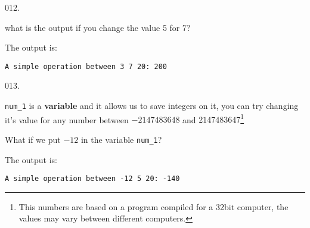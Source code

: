 \documentclass[]{book}
\begin{document}
\vspace{2mm}\noindent\hrulefill{}

\begin{minipage}{\linewidth}\noindent
{\tiny 012.}\\
\begin{minipage}[t]{.485\linewidth}

what is the output if you change the value 5 for 7?

\end{minipage}
\hfill
\begin{minipage}[t]{.485\linewidth}

The output is:

\begin{framed}

\begin{verbatim}
A simple operation between 3 7 20: 200
\end{verbatim}

\end{framed}

\end{minipage}
\end{minipage}

\vspace{2mm}\noindent\hrulefill{}

\begin{minipage}{\linewidth}\noindent
{\tiny 013.}\\
\begin{minipage}[t]{.485\linewidth}

\texttt{num\_1} is a \textbf{variable} and it allows us to save integers
on it, you can try changing it's value for any number between
\(-2147483648\) and \(2147483647\)\footnote{This numbers are based on a
  program compiled for a 32bit computer, the values may vary between
  different computers.}

What if we put \(-12\) in the variable \texttt{num\_1}?

\end{minipage}
\hfill
\begin{minipage}[t]{.485\linewidth}

The output is:

\begin{framed}

\begin{verbatim}
A simple operation between -12 5 20: -140
\end{verbatim}

\end{framed}

\end{minipage}
\end{minipage}
\end{document}
